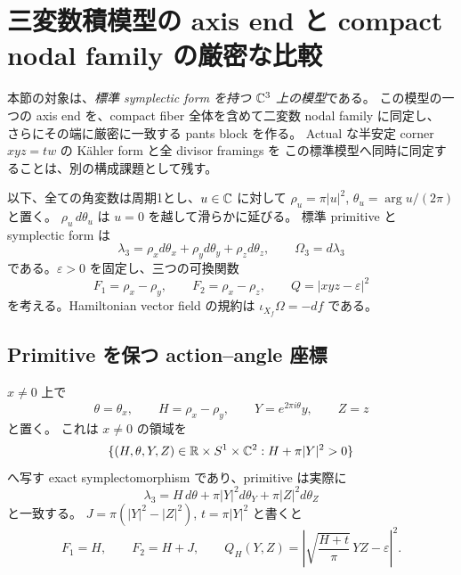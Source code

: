 \section{三変数積模型の axis end と compact nodal family の厳密な比較}
\label{ae:section}

本節の対象は、\emph{標準 symplectic form を持つ $\mathbb C^3$ 上の模型}である。
この模型の一つの axis end を、compact fiber 全体を含めて二変数 nodal family に同定し、
さらにその端に厳密に一致する pants block を作る。
Actual な半安定 corner $xyz=tw$ の Kähler form と全 divisor framings を
この標準模型へ同時に同定することは、別の構成課題として残す。

以下、全ての角変数は周期1とし、$u\in\mathbb C$ に対して
$\rho_u=\pi|u|^2$, $\theta_u=\arg u/(2\pi)$ と置く。
$\rho_u\,d\theta_u$ は $u=0$ を越して滑らかに延びる。
標準 primitive と symplectic form は
\[
 \lambda_3=\rho_xd\theta_x+\rho_yd\theta_y+\rho_zd\theta_z,
 \qquad \Omega_3=d\lambda_3
\]
である。$\varepsilon>0$ を固定し、三つの可換関数
\begin{equation}\label{ae:three-variable}
 F_1=\rho_x-\rho_y,\qquad F_2=\rho_x-\rho_z,
 \qquad Q=|xyz-\varepsilon|^2
\end{equation}
を考える。Hamiltonian vector field の規約は $\iota_{X_f}\Omega=-df$ である。

\subsection{Primitive を保つ action--angle 座標}

\begin{proposition}\label{ae:exact-coordinate}
$x\ne0$ 上で
\begin{equation}\label{ae:coordinate-formula}
 \theta=\theta_x,\qquad H=\rho_x-\rho_y,\qquad
 Y=e^{2\pi i\theta}y,\qquad Z=z
\end{equation}
と置く。
これは $x\ne0$ の領域を
\[
 \{(H,\theta,Y,Z)\in\mathbb R\times S^1\times\mathbb C^2:
 H+\pi|Y|^2>0\}
\]
へ写す exact symplectomorphism であり、primitive は実際に
\begin{equation}\label{ae:primitive-equality}
 \lambda_3=H\,d\theta+\pi|Y|^2d\theta_Y+\pi|Z|^2d\theta_Z
\end{equation}
と一致する。
$J=\pi(|Y|^2-|Z|^2)$, $t=\pi|Y|^2$ と書くと
\begin{equation}\label{ae:radial-family}
 F_1=H,\qquad F_2=H+J,\qquad
 Q_H(Y,Z)=\left|\sqrt{\frac{H+t}{\pi}}\,YZ-\varepsilon\right|^2.
\end{equation}
\end{proposition}


